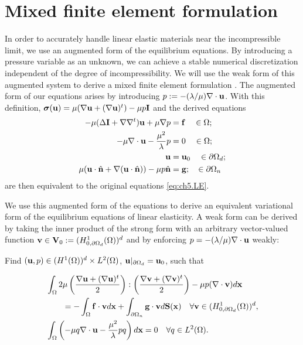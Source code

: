 \section{Mixed finite element formulation} \label{sec:ch5.mixedfem}

In order to accurately handle linear elastic materials near the incompressible limit, we use an augmented form of the equilibrium equations. By introducing a pressure variable as an unknown, we can achieve a stable numerical discretization independent of the degree of incompressibility. We will use the weak form of this augmented system to derive a mixed finite element formulation \cite{Brezzi91}. The augmented form of our equations arises by introducing $p := -(\lambda/\mu) \nabla \cdot \mathbf{u}$. With this definition, $\boldsymbol{\sigma}(\mathbf{u}) = \mu (\nabla \mathbf{u} + (\nabla \mathbf{u})^t) - \mu p \mathbf{I}$ and the derived equations
\begin{subequations} \label{eq:ch5.augmented.strong}
\begin{align}
-\mu (\Delta \mathbf{I} + \nabla \nabla^t) \mathbf{u} + \mu \nabla p & = \mathbf{f} \quad \in \Omega; \label{eq:ch5.augmented.strong.PDE} \\
-\mu \nabla \cdot \mathbf{u} - \frac{\mu^2}{\lambda} p & = 0 \quad \in \Omega; \\
\mathbf{u} & = \mathbf{u}_0 \quad \in \partial\Omega_d; \\
\mu (\mathbf{u} \cdot \hat{\mathbf{n}} + \nabla (\mathbf{u} \cdot \hat{\mathbf{n}})) - \mu p \hat{\mathbf{n}} & = \mathbf{g}; \quad \in \partial\Omega_n
\end{align}
\end{subequations}
are then equivalent to the original equations \eqref{eq:ch5.LE}.

We use this augmented form of the equations to derive an equivalent variational form of the equilibrium equations of linear elasticity. A weak form can be derived by taking the inner product of the strong form with an arbitrary vector-valued function $\mathbf{v} \in \mathbf{V}_0 := (H_{0,\partial\Omega_d}^1(\Omega))^d$ and by enforcing $p = -(\lambda/\mu) \nabla \cdot \mathbf{u}$ weakly:
\begin{center}
Find $(\mathbf{u},p) \in (H^1(\Omega))^d \times L^2(\Omega)$, $\mathbf{u} \rvert_{\partial\Omega_d} = \mathbf{u}_0$, such that
\end{center}
\begin{subequations} \label{eq:ch5.augmented.weak}
\begin{align}
& \int_{\Omega} 2 \mu \left( \frac{\nabla \mathbf{u} + (\nabla \mathbf{u})^t}{2} \right) : \left( \frac{\nabla \mathbf{v} + (\nabla \mathbf{v})^t}{2} \right) - \mu p (\nabla \cdot \mathbf{v}) d\mathbf{x} \\
& \qquad = -\int_{\Omega} \mathbf{f} \cdot \mathbf{v} d\mathbf{x} + \int_{\partial\Omega_n} \mathbf{g} \cdot \mathbf{v} d\mathbf{S}(\mathbf{x}) \quad \forall \mathbf{v} \in (H^1_{0,\partial\Omega_d}(\Omega))^d, \\
& \int_{\Omega} \left( -\mu q \nabla \cdot \mathbf{u} - \frac{\mu^2}{\lambda} p q \right) d\mathbf{x} = 0 \quad \forall q \in L^2(\Omega).
\end{align}
\end{subequations}

